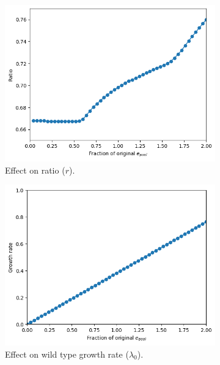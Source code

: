 \begin{figure}
  \centering
  \begin{subfigure}[htpb]{0.45\textwidth}
   \centering
   \includegraphics[width=\textwidth]{epool_ec_ratio_shrinkyaxis}
   \caption{
     Effect on ratio ($r$).
   }
   \label{fig:model-pool-ratio}
  \end{subfigure}
  \begin{subfigure}[htpb]{0.45\textwidth}
   \centering
   \includegraphics[width=\textwidth]{epool_ec_gr}
   \caption{
     Effect on wild type growth rate ($\lambda_{0}$).
   }
   \label{fig:model-pool-growthrate}
  \end{subfigure}
  \begin{subfigure}[htpb]{0.45\textwidth}

\end{subfigure}
\end{figure}
